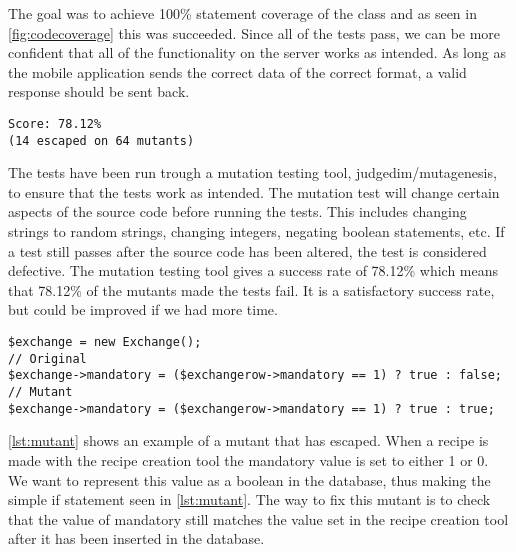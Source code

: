 The goal was to achieve 100\% statement coverage of the  class and as seen in \autoref{fig:codecoverage} this was succeeded. Since all of the tests pass, we can be more confident that all of the functionality on the server works as intended. As long as the mobile application sends the correct data of the correct format, a valid response should be sent back.

\begin{lstlisting}[numbers=none, basicstyle=\ttfamily, caption={The result of the Mutagenesis test.}]
Score: 78.12%
(14 escaped on 64 mutants)
\end{lstlisting}

The tests have been run trough a mutation testing tool, judgedim/mutagenesis, to ensure that the tests work as intended. The mutation test will change certain aspects of the source code before running the tests. This includes changing strings to random strings, changing integers, negating boolean statements, etc. If a test still passes after the source code has been altered, the test is considered defective. The mutation testing tool gives a success rate of 78.12\% which means that 78.12\% of the mutants made the tests fail. It is a satisfactory success rate, but could be improved if we had more time.

\begin{lstlisting}[label=lst:mutant, caption={Example of an escaped mutant.}]
$exchange = new Exchange();
// Original
$exchange->mandatory = ($exchangerow->mandatory == 1) ? true : false;
// Mutant
$exchange->mandatory = ($exchangerow->mandatory == 1) ? true : true;
\end{lstlisting}%

\autoref{lst:mutant} shows an example of a mutant that has escaped. When a recipe is made with the recipe creation tool the mandatory value is set to either 1 or 0. We want to represent this value as a boolean in the database, thus making the simple if statement seen in \autoref{lst:mutant}. The way to fix this mutant is to check that the value of mandatory still matches the value set in the recipe creation tool after it has been inserted in the database.

